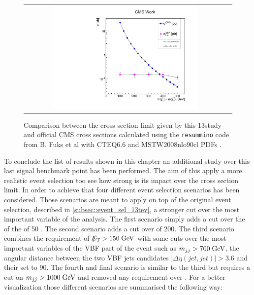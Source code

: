 \begin{figure}[tbh!]
	\centering
	\begin{tabular}{cc}
		\includegraphics[width=0.75\textwidth]{analysis/pics/out_xsecmin_lspcomp_stauclose.pdf}
	\end{tabular}
	\caption{Comparison between the cross section limit given by this 13\tev study and official CMS cross sections calculated using the \texttt{resummino} code from B. Fuks et al with CTEQ6.6 and MSTW2008nlo90cl PDFs \cite{Fuks:2013vua}.}
	\label{fig:xsec_confront_13tev}
\end{figure}


To conclude the list of results shown in this chapter an additional study over this last signal benchmark point has been performed. The aim of this apply a more realistic event selection too see how strong is its impact over the cross section limit. In order to achieve that four different event selection scenarios has been considered. Those scenarios are meant to apply on top of the original event selection, described in \autoref{subsec::event_sel_13tev}, a stronger cut over the most important variable of the analysis. The first scenario simply adds a cut over the \pt of the \hadtau of 50 \gev. The second scenario adds a cut over \met of 200\gev. The third scenario combines the requirement of $\slash\mkern-12mu{E}_{\text{T}} > 150\;\text{Ge}\kern-0.06667em\text{V}$  with some cuts over the most important variables of the VBF part of the event such as $m_{jj} > 700\;\text{Ge}\kern-0.06667em\text{V}$, the angular distance between the two VBF jets candidates $|\Delta\eta(jet,jet)| > 3.6$ and their \pt set to 90\gev. The fourth and final scenario is similar to the third but requires a cut on  $m_{jj} > 1000\;\text{Ge}\kern-0.06667em\text{V}$ and removed any requirement over \met. For a better visualization those different scenarios are summarised the following way:


